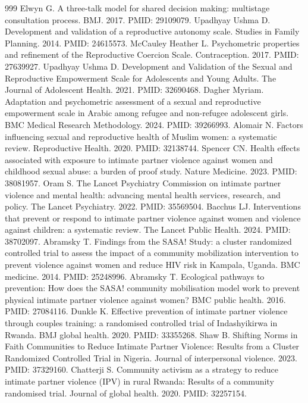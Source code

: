 \begin{thebibliography}{999}
 Elwyn G. A three-talk model for shared decision making: multistage consultation process. BMJ. 2017. PMID: 29109079.
 Upadhyay Ushma D. Development and validation of a reproductive autonomy scale. Studies in Family Planning. 2014. PMID: 24615573.
 McCauley Heather L. Psychometric properties and refinement of the Reproductive Coercion Scale. Contraception. 2017. PMID: 27639927.
 Upadhyay Ushma D. Development and Validation of the Sexual and Reproductive Empowerment Scale for Adolescents and Young Adults. The Journal of Adolescent Health. 2021. PMID: 32690468.
 Dagher Myriam. Adaptation and psychometric assessment of a sexual and reproductive empowerment scale in Arabic among refugee and non-refugee adolescent girls. BMC Medical Research Methodology. 2024. PMID: 39266993.
 Alomair N. Factors influencing sexual and reproductive health of Muslim women: a systematic review. Reproductive Health. 2020. PMID: 32138744.
 Spencer CN. Health effects associated with exposure to intimate partner violence against women and childhood sexual abuse: a burden of proof study. Nature Medicine. 2023. PMID: 38081957.
 Oram S. The Lancet Psychiatry Commission on intimate partner violence and mental health: advancing mental health services, research, and policy. The Lancet Psychiatry. 2022. PMID: 35569504.
 Bacchus LJ. Interventions that prevent or respond to intimate partner violence against women and violence against children: a systematic review. The Lancet Public Health. 2024. PMID: 38702097.
 Abramsky T. Findings from the SASA! Study: a cluster randomized controlled trial to assess the impact of a community mobilization intervention to prevent violence against women and reduce HIV risk in Kampala, Uganda. BMC medicine. 2014. PMID: 25248996.
 Abramsky T. Ecological pathways to prevention: How does the SASA! community mobilisation model work to prevent physical intimate partner violence against women? BMC public health. 2016. PMID: 27084116.
 Dunkle K. Effective prevention of intimate partner violence through couples training: a randomised controlled trial of Indashyikirwa in Rwanda. BMJ global health. 2020. PMID: 33355268.
 Shaw B. Shifting Norms in Faith Communities to Reduce Intimate Partner Violence: Results from a Cluster Randomized Controlled Trial in Nigeria. Journal of interpersonal violence. 2023. PMID: 37329160.
 Chatterji S. Community activism as a strategy to reduce intimate partner violence (IPV) in rural Rwanda: Results of a community randomised trial. Journal of global health. 2020. PMID: 32257154.

\end{thebibliography}
